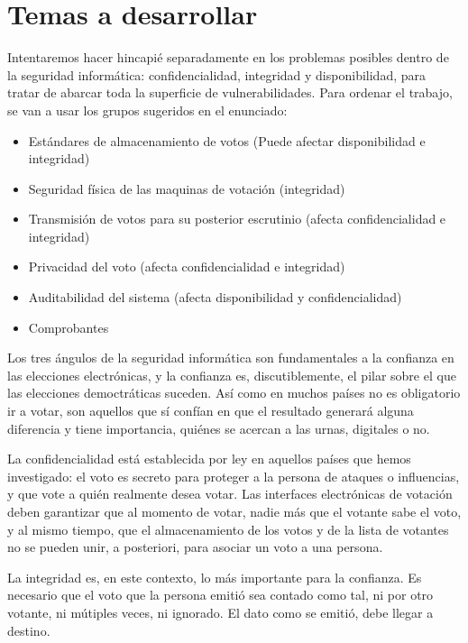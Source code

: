 \documentclass[a4,11pt]{article}
\begin{document}
\section{Temas a desarrollar}

Intentaremos hacer hincapié separadamente en los problemas posibles dentro de la seguridad informática: confidencialidad, integridad y disponibilidad, para tratar de abarcar toda la superficie de vulnerabilidades. Para ordenar el trabajo, se van a usar los grupos sugeridos en el enunciado:

\begin{itemize}
\item Estándares de almacenamiento de votos (Puede afectar disponibilidad e integridad)
\item Seguridad física de las maquinas de votación (integridad)
\item Transmisión de votos para su posterior escrutinio (afecta confidencialidad e integridad)
\item Privacidad del voto (afecta confidencialidad e integridad)
\item Auditabilidad del sistema  (afecta disponibilidad y confidencialidad)
\item Comprobantes
\end{itemize}

Los tres ángulos de la seguridad informática son fundamentales a la confianza en las elecciones electrónicas, y la confianza es, discutiblemente, el pilar sobre el que las elecciones democtráticas suceden. Así como en muchos países no es obligatorio ir a votar, son aquellos que sí confían en que el resultado generará alguna diferencia y tiene importancia, quiénes se acercan a las urnas, digitales o no.

La confidencialidad está establecida por ley en aquellos países que hemos investigado: el voto es secreto para proteger a la persona de ataques o influencias, y que vote a quién realmente desea votar. Las interfaces electrónicas de votación deben garantizar que al momento de votar, nadie más que el votante sabe el voto, y al mismo tiempo, que el almacenamiento de los votos y de la lista de votantes no se pueden unir, a posteriori, para asociar un voto a una persona.

La integridad es, en este contexto, lo más importante para la confianza. Es necesario que el voto que la persona emitió sea contado como tal, ni por otro votante, ni mútiples veces, ni ignorado. El dato como se emitió, debe llegar a destino.
\end{document}

